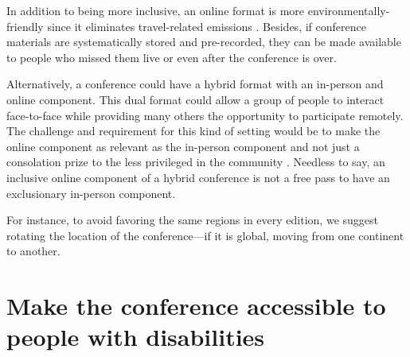 \documentclass[10pt,letterpaper]{article}
\begin{document}
In addition to being more inclusive, an online format is more environmentally-friendly since it eliminates travel-related emissions \cite{sarabipourChangingScientificMeetings2021,ninerBetterWhomLeveling2021, gattrellComparisonCarbonCosts2021}. 
Besides, if conference materials are systematically stored and pre-recorded, they can be made available to people who missed them live or even after the conference is over. 

Alternatively, a conference could have a hybrid format with an in-person and online component. This dual format could allow a group of people to interact face-to-face while providing many others the opportunity to participate remotely. The challenge and requirement for this kind of setting would be to make the online component as relevant as the in-person component and not just a consolation prize to the less privileged in the community \cite{ninerBetterWhomLeveling2021}.
Needless to say, an inclusive online component of a hybrid conference is not a free pass to have an exclusionary in-person component. %

For instance, to avoid favoring the same regions in every edition, we suggest rotating the location of the conference—if it is global, moving from one continent to another. 


\section{Make the conference accessible to people with disabilities}
\label{rule_accessibility}

\end{document}

